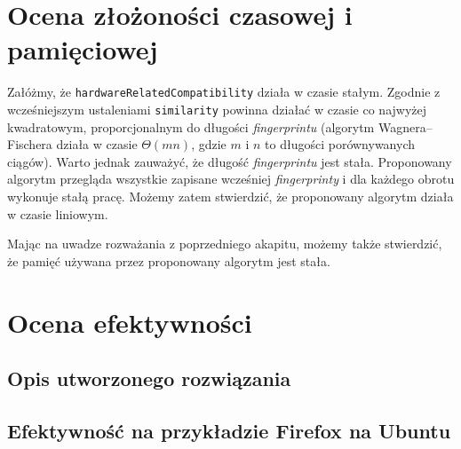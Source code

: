 

\section{Ocena złożoności czasowej i pamięciowej}
Załóżmy, że \texttt{hardwareRelatedCompatibility} działa w czasie stałym.
Zgodnie z wcześniejszym ustaleniami \texttt{similarity} powinna działać w czasie
co najwyżej kwadratowym, proporcjonalnym do długości \emph{fingerprintu}
(algorytm Wagnera--Fischera działa w czasie \(\Theta(mn)\), gdzie \(m\) i \(n\)
to długości porównywanych ciągów). Warto jednak zauważyć, że długość
\emph{fingerprintu} jest stała. Proponowany algorytm przegląda wszystkie
zapisane wcześniej \emph{fingerprinty} i dla każdego obrotu wykonuje stałą
pracę. Możemy zatem stwierdzić, że proponowany algorytm działa w czasie
liniowym.

Mając na uwadze rozważania z poprzedniego akapitu, możemy także stwierdzić, że
pamięć używana przez proponowany algorytm jest stała.

\section{Ocena efektywności}

\subsection{Opis utworzonego rozwiązania}

\subsection{Efektywność na przykładzie Firefox na Ubuntu}
